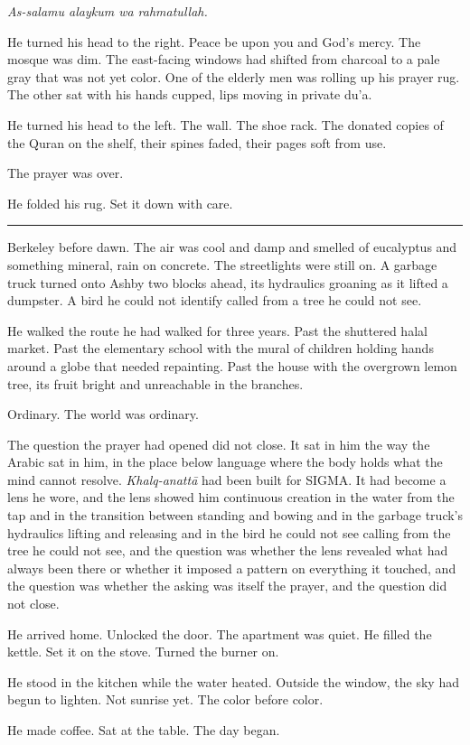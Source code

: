 \documentclass[11pt]{article}
\begin{document}
\emph{As-salamu alaykum wa rahmatullah.}

He turned his head to the right. Peace be upon you and God's mercy. The mosque was dim. The east-facing windows had shifted from charcoal to a pale gray that was not yet color. One of the elderly men was rolling up his prayer rug. The other sat with his hands cupped, lips moving in private du'a.

He turned his head to the left. The wall. The shoe rack. The donated copies of the Quran on the shelf, their spines faded, their pages soft from use.

The prayer was over.

He folded his rug. Set it down with care.

\begin{center}\rule{0.3\linewidth}{0.4pt}\end{center}

Berkeley before dawn. The air was cool and damp and smelled of eucalyptus and something mineral, rain on concrete. The streetlights were still on. A garbage truck turned onto Ashby two blocks ahead, its hydraulics groaning as it lifted a dumpster. A bird he could not identify called from a tree he could not see.

He walked the route he had walked for three years. Past the shuttered halal market. Past the elementary school with the mural of children holding hands around a globe that needed repainting. Past the house with the overgrown lemon tree, its fruit bright and unreachable in the branches.

Ordinary. The world was ordinary.

The question the prayer had opened did not close. It sat in him the way the Arabic sat in him, in the place below language where the body holds what the mind cannot resolve. \emph{Khalq-anatt\=a} had been built for SIGMA. It had become a lens he wore, and the lens showed him continuous creation in the water from the tap and in the transition between standing and bowing and in the garbage truck's hydraulics lifting and releasing and in the bird he could not see calling from the tree he could not see, and the question was whether the lens revealed what had always been there or whether it imposed a pattern on everything it touched, and the question was whether the asking was itself the prayer, and the question did not close.

He arrived home. Unlocked the door. The apartment was quiet. He filled the kettle. Set it on the stove. Turned the burner on.

He stood in the kitchen while the water heated. Outside the window, the sky had begun to lighten. Not sunrise yet. The color before color.

He made coffee. Sat at the table. The day began.
\end{document}
